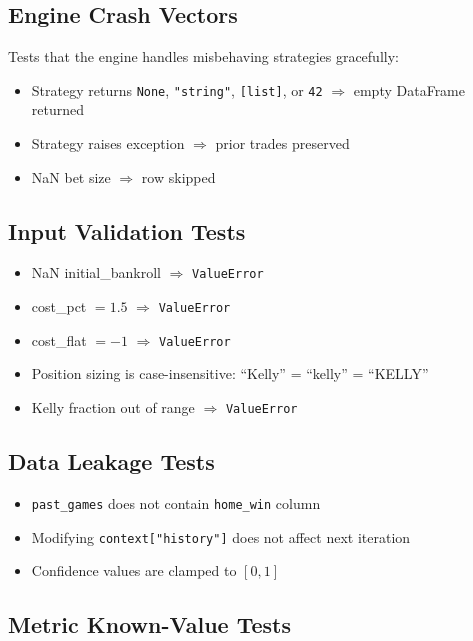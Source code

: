 \documentclass[12pt,a4paper]{report}
\theoremstyle{definition}
\newcommand{\code}[1]{\texttt{#1}}
\begin{document}
\subsection{Engine Crash Vectors}

Tests that the engine handles misbehaving strategies gracefully:
\begin{itemize}
    \item Strategy returns \code{None}, \code{"string"}, \code{[list]}, or \code{42} $\Rightarrow$ empty DataFrame returned
    \item Strategy raises exception $\Rightarrow$ prior trades preserved
    \item NaN bet size $\Rightarrow$ row skipped
\end{itemize}

\subsection{Input Validation Tests}

\begin{itemize}
    \item NaN initial\_bankroll $\Rightarrow$ \code{ValueError}
    \item cost\_pct $= 1.5$ $\Rightarrow$ \code{ValueError}
    \item cost\_flat $= -1$ $\Rightarrow$ \code{ValueError}
    \item Position sizing is case-insensitive: ``Kelly'' = ``kelly'' = ``KELLY''
    \item Kelly fraction out of range $\Rightarrow$ \code{ValueError}
\end{itemize}

\subsection{Data Leakage Tests}

\begin{itemize}
    \item \code{past\_games} does not contain \code{home\_win} column
    \item Modifying \code{context["history"]} does not affect next iteration
    \item Confidence values are clamped to $[0, 1]$
\end{itemize}

\subsection{Metric Known-Value Tests}
\end{document}
